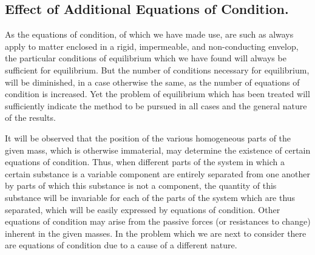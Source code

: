 \documentclass[12pt]{article}
\begin{document}
\subsection{Effect of Additional Equations of Condition.}

As the equations of condition, of which we have made use, are such as always apply to matter enclosed in a rigid, impermeable, and non-conducting envelop, the particular conditions of equilibrium which we have found will always be sufficient for equilibrium. But the number of conditions necessary for equilibrium, will be diminished, in a case otherwise the same, as the number of equations of condition is increased. Yet the problem of equilibrium which has been treated will sufficiently indicate the method to be pursued in all cases and the general nature of the results.

It will be observed that the position of the various homogeneous parts of the given mass, which is otherwise immaterial, may determine the existence of certain equations of condition. Thus, when different parts of the system in which a certain substance is a variable component are entirely separated from one another by parts of which this substance is not a component, the quantity of this substance will be invariable for each of the parts of the system which are thus separated, which will be easily expressed by equations of condition. Other equations of condition may arise from the passive forces (or resistances to change) inherent in the given masses. In the problem which we are next to consider there are equations of condition due to a cause of a different nature.
\end{document}
